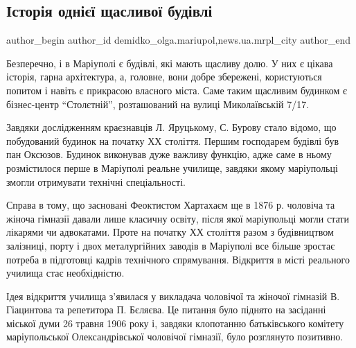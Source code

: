  
 
 
 
 
 
\subsection{Історія однієї щасливої будівлі}
\label{sec:17_10_2017.stz.news.ua.mrpl_city.1.istoria_odniei_schaslyvoj_budivli}
 
\ifcmt
 author_begin
   author_id demidko_olga.mariupol,news.ua.mrpl_city
 author_end
\fi

Безперечно, і в Маріуполі є будівлі, які мають щасливу долю. У них є цікава
історія, гарна архітектура, а, головне, вони добре збережені, користуються
попитом і навіть є прикрасою власного міста. Саме таким щасливим будинком є
бізнес-центр \enquote{Столєтній}, розташований на вулиці Миколаївській 7/17.


Завдяки дослідженням краєзнавців Л. Яруцькому, С. Бурову стало відомо, що
побудований будинок на початку ХХ століття. Першим господарем будівлі був пан
Оксюзов. Будинок виконував дуже важливу функцію, адже саме в ньому розмістилося
перше в Маріуполі реальне училище, завдяки якому маріупольці змогли отримувати
технічні спеціальності.

Справа в тому, що засновані Феоктистом Хартахаєм ще в 1876 р. чоловіча та
жіноча гімназії давали лише класичну освіту, після якої маріупольці могли стати
лікарями чи адвокатами. Проте на початку ХХ століття разом з будівництвом
залізниці, порту і двох металургійних заводів в Маріуполі все більше зростає
потреба в підготовці кадрів технічного спрямування. Відкриття в місті реального
училища стає необхідністю.

Ідея відкриття училища з’явилася у викладача чоловічої та жіночої гімназій В.
Гіацинтова та репетитора П. Бєляєва. Це питання було піднято на засіданні
міської думи 26 травня 1906 року і, завдяки клопотанню батьківського комітету
маріупольської Олександрівської чоловічої гімназії, було розглянуто позитивно.

